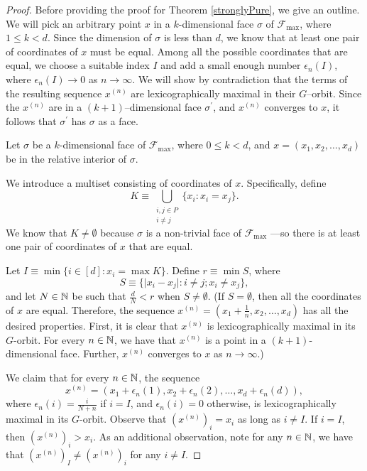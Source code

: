 \begin{proof}
Before providing the proof for Theorem \ref{stronglyPure}, we give an outline. We will pick an arbitrary point $x$ in a $k$-dimensional face $\sigma$ of $\mathcal{F}_{\max}$, where $1 \le k < d$. Since the dimension of $\sigma$ is less than $d$, we know that at least one pair of coordinates of $x$ must be equal. Among all the possible coordinates that are equal, we choose a suitable index $I$ and add a small enough number $\epsilon_n(I)$, where $\epsilon_n(I) \rightarrow 0$ as $n \rightarrow \infty$. We will show by contradiction that the terms of the resulting sequence $x^{(n)}$ are lexicographically maximal in their $G$--orbit. Since the $x^{(n)}$ are in a $(k + 1)$--dimensional face $\sigma^\prime$, and $x^{(n)}$ converges to $x$, it follows that $\sigma^\prime$ has $\sigma$ as a face.

Let $\sigma$ be a $k$-dimensional face of $\mathcal{F}_{\max}$, where $0 \le k < d$, and $x = (x_1, x_2, \dots , x_d)$ be in the relative interior of $\sigma$.

We introduce a multiset consisting of coordinates of $x$. Specifically, define \[K \equiv \bigcup_{\substack{i,j \in P  \\ i \neq j}} \{x_i : x_i = x_j\}.\] We know that $K \neq \emptyset$ because $\sigma$ is a non-trivial face of $\mathcal{F}_{\max}$ ---so there is at least one pair of coordinates of $x$ that are equal.

Let $I \equiv \min\{i \in [d] : x_i = \max K\}$. Define $r \equiv \min S$, where \[S \equiv \{\vert x_i - x_j \vert : i \neq j; x_i \neq x_j\},\] and let $N\in\mathbb{N}$ be such that $\frac{d}{N} < r$ when $S \neq \emptyset$. (If $S = \emptyset$, then all the coordinates of $x$ are equal. Therefore, the sequence $x^{(n)} = (x_1 + \frac{1}{n}, x_2, \dots , x_d)$ has all the desired properties. First, it is clear that $x^{(n)}$ is lexicographically maximal in its $G$-orbit. For every $n\in\mathbb{N}$, we have that $x^{(n)}$ is a point in a $(k+1)$-dimensional face. Further, $x^{(n)}$ converges to $x$ as $n \rightarrow \infty$.)

We claim that for every $n\in\mathbb{N}$, the sequence \[x^{(n)} = (x_1 + \epsilon_n(1), x_2 + \epsilon_n(2), \dots , x_d + \epsilon_n(d)),\] where $\epsilon_n(i) = \frac{i}{N + n}$ if $i = I$, and $\epsilon_n(i) = 0$ otherwise, is lexicographically maximal in its $G$-orbit. Observe that $(x^{(n)})_i = x_i$ as long as $i \neq I$. If $i = I$, then $(x^{(n)})_i > x_i$. As an additional observation, note for any $n\in\mathbb{N}$, we have that $(x^{(n)})_I \neq (x^{(n)})_i$ for any $i \neq I$.


\end{proof}
